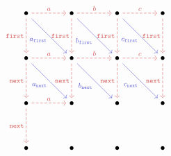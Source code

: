 \begin{figure}[!ht]
   \begin{subfigure}[b]{0.4\textwidth}
      \[\begin{tikzcd}[cramped, column sep=scriptsize]
	 \bullet && \bullet && \bullet && \bullet \\
	 \\
	 \bullet && \bullet && \bullet && \bullet \\
	 \\
	 \bullet && \bullet && \bullet && \bullet \\
	 \\
	 \bullet && \bullet && \bullet && \bullet
	 \arrow["a", color={rgb,255:red,214;green,92;blue,92}, dashed, from=1-1, to=1-3]
	 \arrow["{\mathtt{first}}"', color={rgb,255:red,214;green,92;blue,92}, dashed, from=1-1, to=3-1]
	 \arrow["{a_\mathtt{first}}"', color={rgb,255:red,92;green,92;blue,214}, from=1-1, to=3-3]
	 \arrow["b", color={rgb,255:red,214;green,92;blue,92}, dashed, from=1-3, to=1-5]
	 \arrow["{\mathtt{first}}"', color={rgb,255:red,214;green,92;blue,92}, dashed, from=1-3, to=3-3]
	 \arrow["{b_\mathtt{first}}"', color={rgb,255:red,92;green,92;blue,214}, from=1-3, to=3-5]
	 \arrow["c", color={rgb,255:red,214;green,92;blue,92}, dashed, from=1-5, to=1-7]
	 \arrow["{\mathtt{first}}"', color={rgb,255:red,214;green,92;blue,92}, dashed, from=1-5, to=3-5]
	 \arrow["{c_\mathtt{first}}"', color={rgb,255:red,92;green,92;blue,214}, from=1-5, to=3-7]
	 \arrow["{\mathtt{first}}"', color={rgb,255:red,214;green,92;blue,92}, dashed, from=1-7, to=3-7]
	 \arrow["a", color={rgb,255:red,214;green,92;blue,92}, dashed, from=3-1, to=3-3]
	 \arrow["{\mathtt{next}}"', color={rgb,255:red,214;green,92;blue,92}, dashed, from=3-1, to=5-1]
	 \arrow["{a_\mathtt{next}}"', color={rgb,255:red,92;green,92;blue,214}, from=3-1, to=5-3]
	 \arrow["b", color={rgb,255:red,214;green,92;blue,92}, dashed, from=3-3, to=3-5]
	 \arrow["{\mathtt{next}}"', color={rgb,255:red,214;green,92;blue,92}, dashed, from=3-3, to=5-3]
	 \arrow["{b_\mathtt{next}}"', color={rgb,255:red,92;green,92;blue,214}, from=3-3, to=5-5]
	 \arrow["c", color={rgb,255:red,214;green,92;blue,92}, dashed, from=3-5, to=3-7]
	 \arrow["{\mathtt{next}}"', color={rgb,255:red,214;green,92;blue,92}, dashed, from=3-5, to=5-5]
	 \arrow["{c_\mathtt{next}}"', color={rgb,255:red,92;green,92;blue,214}, from=3-5, to=5-7]
	 \arrow["{\mathtt{next}}"', color={rgb,255:red,214;green,92;blue,92}, dashed, from=3-7, to=5-7]
	 \arrow["a", color={rgb,255:red,214;green,92;blue,92}, dashed, from=5-1, to=5-3]
	 \arrow["{\mathtt{next}}"', color={rgb,255:red,214;green,92;blue,92}, dashed, from=5-1, to=7-1]

\end{tikzcd}\]
\end{subfigure}
\end{figure}
